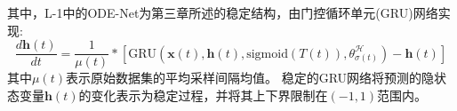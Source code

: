 
其中，L-1中的ODE-Net为第三章所述的稳定结构，由门控循环单元(GRU)网络实现:
\begin{equation}
    \label{equ:dh}
    \frac{d \boldsymbol{h}(t)}{dt} = \frac{1}{\mu(t)}*\left[\text{GRU}(\boldsymbol{x}(t), \boldsymbol{h}(t),\text{sigmoid}(T(t)), \theta^\mathcal{H}_{\sigma(t)}) - \boldsymbol{h}(t)\right]
\end{equation}
其中$\mu(t)$表示原始数据集的平均采样间隔均值。
稳定的GRU网络将预测的隐状态变量$\boldsymbol{h}(t)$的变化表示为稳定过程，并将其上下界限制在$(-1,1)$范围内。




